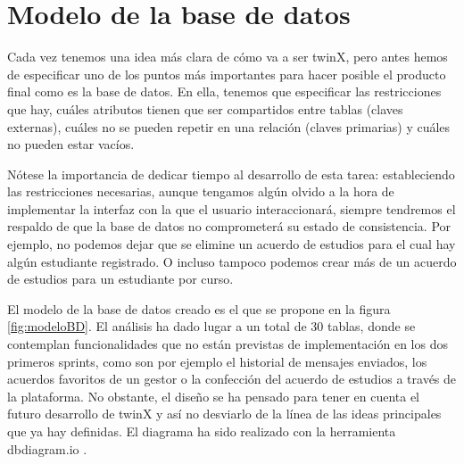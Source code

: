 \newpage
\section{Modelo de la base de datos}

Cada vez tenemos una idea más clara de cómo va a ser twinX, pero antes hemos de especificar uno de los puntos más importantes para hacer posible el producto final como es la base de datos. En ella, tenemos que especificar las restricciones que hay, cuáles atributos tienen que ser compartidos entre tablas (claves externas), cuáles no se pueden repetir en una relación (claves primarias) y cuáles no pueden estar vacíos.

Nótese la importancia de dedicar tiempo al desarrollo de esta tarea: estableciendo las restricciones necesarias, aunque tengamos algún olvido a la hora de implementar la interfaz con la que el usuario interaccionará, siempre tendremos el respaldo de que la base de datos no comprometerá su estado de consistencia. Por ejemplo, no podemos dejar que se elimine un acuerdo de estudios para el cual hay algún estudiante registrado. O incluso tampoco podemos crear más de un acuerdo de estudios para un estudiante por curso.

El modelo de la base de datos creado es el que se propone en la figura \ref{fig:modeloBD}. El análisis ha dado lugar a un total de 30 tablas, donde se contemplan funcionalidades que no están previstas de implementación en los dos primeros sprints, como son por ejemplo el historial de mensajes enviados, los acuerdos favoritos de un gestor o la confección del acuerdo de estudios a través de la plataforma. No obstante, el diseño se ha pensado para tener en cuenta el futuro desarrollo de twinX y así no desviarlo de la línea de las ideas principales que ya hay definidas. El diagrama ha sido realizado con la herramienta dbdiagram.io \cite{dbdiagram}.

